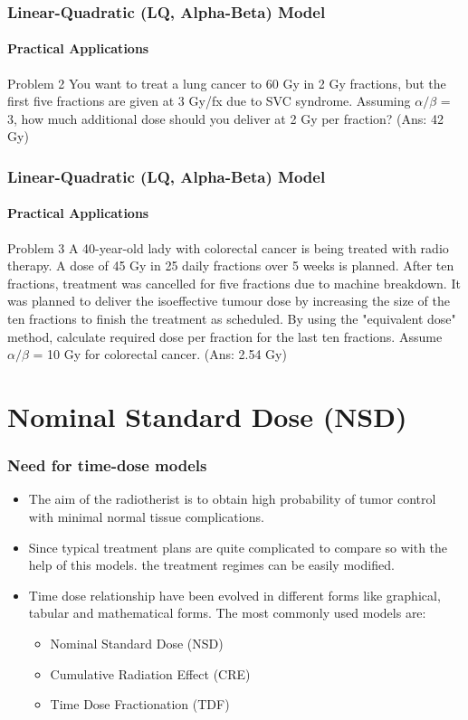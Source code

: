 \documentclass{beamer}
\begin{document}
\begin{frame}
  \frametitle{Linear-Quadratic (LQ, Alpha-Beta) Model}
  \framesubtitle{Practical Applications}
  \begin{alertblock}{Problem 2}
    You want to treat a lung cancer to 60 Gy in 2 Gy fractions, but the first five  fractions are given at 3 Gy/fx due to SVC syndrome. Assuming $\alpha/\beta$ = 3, how much additional dose should you deliver at 2 Gy per  fraction? (Ans: 42 Gy)
  \end{alertblock}
\end{frame}

\begin{frame}
  \frametitle{Linear-Quadratic (LQ, Alpha-Beta) Model}
  \framesubtitle{Practical Applications}
  \begin{alertblock}{Problem 3}
    A 40-year-old lady with colorectal cancer is being treated with radio therapy. A dose of 45 Gy in 25 daily fractions over 5 weeks is planned. After ten fractions, treatment was cancelled for five fractions due to machine breakdown. It was planned to deliver the isoeffective tumour dose by increasing the size of the ten fractions to finish the treatment as scheduled. By using the "equivalent dose" method, calculate required dose per fraction for the last ten fractions. Assume $\alpha/\beta$ = 10 Gy for colorectal cancer. (Ans: 2.54 Gy)


  \end{alertblock}
\end{frame}



\section{Nominal Standard Dose (NSD)}
\begin{frame}
  \frametitle{Need for time-dose models}
  \begin{itemize}
    \item The aim of the radiotherist is to obtain high probability of tumor control with minimal normal tissue complications.
    \item Since typical treatment plans are quite complicated to compare so with the help of this models. the treatment regimes can be easily modified.
    \item Time dose relationship have been evolved in different forms like graphical, tabular and mathematical forms. The most commonly used models are:
    \begin{itemize}
      \item Nominal Standard Dose (NSD)
      \item Cumulative Radiation Effect (CRE)
      \item Time Dose Fractionation (TDF)
    \end{itemize}
  \end{itemize}
\end{frame}
\end{document}
